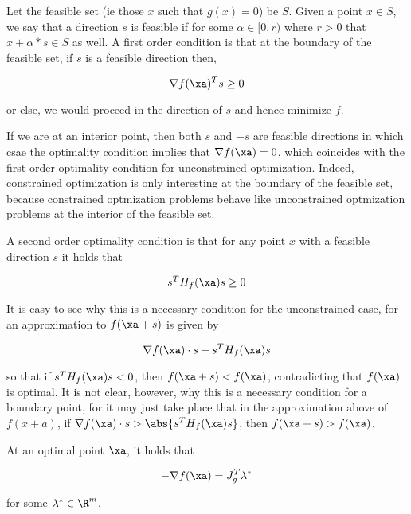 \documentclass[../main.tex]{subfiles}
\begin{document}
\begin{remark}
    Let the feasible set (ie those $x$ such that $g(x) = 0$) be $S$.
    Given a point $x \in S$, we say that a direction $s$ is feasible
    if for some $\alpha \in [0,r)$ where $r >0$ that $x + \alpha *s \in S$ as well.
    A first order condition is that at the boundary of the feasible set,
    if $s$ is a feasible direction then,

    \[
        \nabla f(\xa)^T s \geq 0
    \]

    or else, we would proceed in the direction of $s$ and hence minimize $f$.

    If we are at an interior point, then both $s$ and $-s$ are feasible directions in which csae the optimality condition implies that $\nabla f(\xa) = 0$, which coincides with the first order optimality condition for unconstrained optimization. Indeed, constrained optimization is only interesting at the boundary of the feasible set, because constrained optmization problems behave like unconstrained optmization problems at the interior of the feasible set.
\end{remark}

\begin{remark}
    A second order optimality condition is that for any point $x$ with a feasible direction $s$ it holds that

    \[
        s^T H_{f}(\xa)s \geq 0
    \]

    It is easy to see why this is a necessary condition for the unconstrained case, for an approximation to $f(\xa + s)$ is given by

    \[
        \nabla f(\xa) \cdot s + s^T H_{f}(\xa)s
    \]

    so that if $s^T H_{f}(\xa)s< 0$, then $f(\xa + s) < f(\xa)$, contradicting that $f(\xa)$ is optimal. It is not clear, however, why this is a necessary condition for a boundary point, for it may just take place that in the approximation above of $f(x + a)$, if $\nabla f(\xa) \cdot s > \abs{s^TH_{f}(\xa)s}$, then $f(\xa + s) > f(\xa)$.
\end{remark}

\begin{proposition}
    At an optimal point $\xa$, it holds that

    \[
        - \nabla f(\xa) = J_{g}^T \lambda^{\ast}
    \]

    for some $\lambda^{\ast} \in \R^m$.
\end{proposition}
\end{document}
